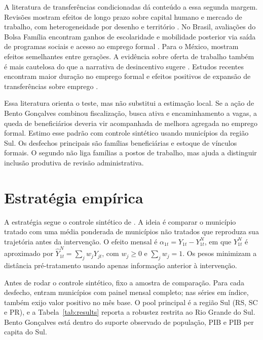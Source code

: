\documentclass[10pt]{article}
\begin{document}
A literatura de transferências condicionadas dá conteúdo a essa segunda margem. Revisões mostram efeitos de longo prazo sobre capital humano e mercado de trabalho, com heterogeneidade por desenho e território \citep{molinamillan2019longterm}. No Brasil, avaliações do Bolsa Família encontram ganhos de escolaridade \citep{glewwe2012bolsa,debrauw2015schooling} e mobilidade posterior via saída de programas sociais e acesso ao emprego formal \citep{fassarella2024mobility}. Para o México, \citet{parker2023cct} mostram efeitos semelhantes entre gerações. A evidência sobre oferta de trabalho também é mais cautelosa do que a narrativa de desincentivo sugere \citep{debrauw2015labor,barbosa2014informality,banerjee2017lazy}. Estudos recentes encontram maior duração no emprego formal e efeitos positivos de expansão de transferências sobre emprego \citep{santos2017duration,best2026productive}.

Essa literatura orienta o teste, mas não substitui a estimação local. Se a ação de Bento Gonçalves combinou fiscalização, busca ativa e encaminhamento a vagas, a queda de beneficiários deveria vir acompanhada de melhora agregada no emprego formal. Estimo esse padrão com controle sintético usando municípios da região Sul. Os desfechos principais são famílias beneficiárias e estoque de vínculos formais. O segundo não liga famílias a postos de trabalho, mas ajuda a distinguir inclusão produtiva de revisão administrativa.

\section{Estratégia empírica}

A estratégia segue o controle sintético de \citet{abadie2010synthetic}. A ideia é comparar o município tratado com uma média ponderada de municípios não tratados que reproduza sua trajetória antes da intervenção. O efeito mensal é $\alpha_{1t}=Y_{1t}-Y^N_{1t}$, em que $Y^N_{1t}$ é aproximado por $\widehat{Y}^N_{1t}=\sum_jw_jY_{jt}$, com $w_j\geq0$ e $\sum_jw_j=1$. Os pesos minimizam a distância pré-tratamento usando apenas informação anterior à intervenção.

Antes de rodar o controle sintético, fixo a amostra de comparação. Para cada desfecho, entram municípios com painel mensal completo; nas séries em índice, também exijo valor positivo no mês base. O pool principal é a região Sul (RS, SC e PR), e a Tabela~\ref{tab:results} reporta a robustez restrita ao Rio Grande do Sul. Bento Gonçalves está dentro do suporte observado de população, PIB e PIB per capita do Sul.
\end{document}
